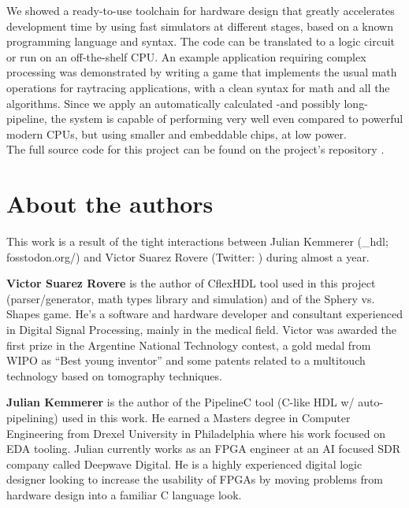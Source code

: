 \documentclass[conference]{IEEEtran}
\begin{document}
We showed a ready-to-use toolchain for hardware design that greatly accelerates development time by using fast simulators at different stages, based on a known programming language and syntax. The code can be translated to a logic circuit or run on an off-the-shelf CPU. An example application requiring complex processing was demonstrated by writing a game that implements the usual math operations for raytracing applications, with a clean syntax for math and all the algorithms. Since we apply an automatically calculated -and possibly long- pipeline, the system is capable of performing very well even compared to powerful modern CPUs, but using smaller and embeddable chips, at low power. \\
The full source code for this project can be found on the project's repository \cite{mainrepo}.
\\

\section{About the authors}
This work is a result of the tight interactions between Julian Kemmerer (\@pipelinec\_hdl; fosstodon.org/\@pipelinec) and Victor Suarez Rovere (Twitter: \@suarezvictor) during almost a year.

\textbf{Victor Suarez Rovere} is the author of CflexHDL tool used in this project (parser/generator, math types library and simulation) and of the Sphery vs. Shapes game. He’s a software and hardware developer and consultant experienced in Digital Signal Processing, mainly in the medical ﬁeld. Victor was awarded the ﬁrst prize in the Argentine National Technology contest, a gold medal from WIPO as “Best young inventor” and some patents related to a multitouch technology based on tomography techniques.

\textbf{Julian Kemmerer} is the author of the PipelineC tool (C-like HDL w/ auto-pipelining) used in this work. He earned a Masters degree in Computer Engineering from Drexel University in Philadelphia where his work focused on EDA tooling. Julian currently works as an FPGA engineer at an AI focused SDR company called Deepwave Digital. He is a highly experienced digital logic designer looking to increase the usability of FPGAs by moving problems from hardware design into a familiar C language look.
\end{document}
